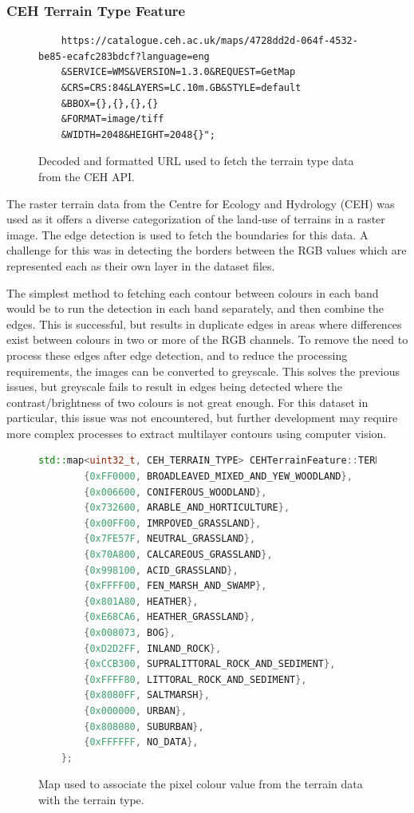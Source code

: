 \documentclass[12pt]{article}
\begin{document}
\subsubsection{CEH Terrain Type Feature}

\begin{figure}[H]
  \centering
  \begin{lstlisting}
	https://catalogue.ceh.ac.uk/maps/4728dd2d-064f-4532-be85-ecafc283bdcf?language=eng
	&SERVICE=WMS&VERSION=1.3.0&REQUEST=GetMap
	&CRS=CRS:84&LAYERS=LC.10m.GB&STYLE=default
	&BBOX={},{},{},{}
	&FORMAT=image/tiff
	&WIDTH=2048&HEIGHT=2048{}";
	\end{lstlisting}
  \caption{Decoded and formatted URL used to fetch the terrain type data from the CEH API.}
  \label{api:terrain}
\end{figure}

The raster terrain data from the Centre for Ecology and Hydrology (CEH) was used as it offers a diverse categorization of the land-use of terrains in a raster image. The edge detection is used to fetch the boundaries for this data. A challenge for this was in detecting the borders between the RGB values which are represented each as their own layer in the dataset files.

The simplest method to fetching each contour between colours in each band would be to run the detection in each band separately, and then combine the edges. This is successful, but results in duplicate edges in areas where differences exist between colours in two or more of the RGB channels. To remove the need to process these edges after edge detection, and to reduce the processing requirements, the images can be converted to greyscale. This solves the previous issues, but greyscale fails to result in edges being detected where the contrast/brightness of two colours is not great enough. For this dataset in particular, this issue was not encountered, but further development may require more complex processes to extract multilayer contours using computer vision.

\begin{figure}[H]
  \centering
  \begin{lstlisting}[language=c++]
	std::map<uint32_t, CEH_TERRAIN_TYPE> CEHTerrainFeature::TERRAIN_COLOURS = {
		{0xFF0000, BROADLEAVED_MIXED_AND_YEW_WOODLAND},
		{0x006600, CONIFEROUS_WOODLAND},
		{0x732600, ARABLE_AND_HORTICULTURE},
		{0x00FF00, IMRPOVED_GRASSLAND},
		{0x7FE57F, NEUTRAL_GRASSLAND},
		{0x70A800, CALCAREOUS_GRASSLAND},
		{0x998100, ACID_GRASSLAND},
		{0xFFFF00, FEN_MARSH_AND_SWAMP},
		{0x801A80, HEATHER},
		{0xE68CA6, HEATHER_GRASSLAND},
		{0x008073, BOG},
		{0xD2D2FF, INLAND_ROCK},
		{0xCCB300, SUPRALITTORAL_ROCK_AND_SEDIMENT},
		{0xFFFF80, LITTORAL_ROCK_AND_SEDIMENT},
		{0x8080FF, SALTMARSH},
		{0x000000, URBAN},
		{0x808080, SUBURBAN},
		{0xFFFFFF, NO_DATA},
	};
	\end{lstlisting}
  \caption{Map used to associate the pixel colour value from the terrain data with the terrain type.}
  \label{terrain:map}
\end{figure}
\end{document}

